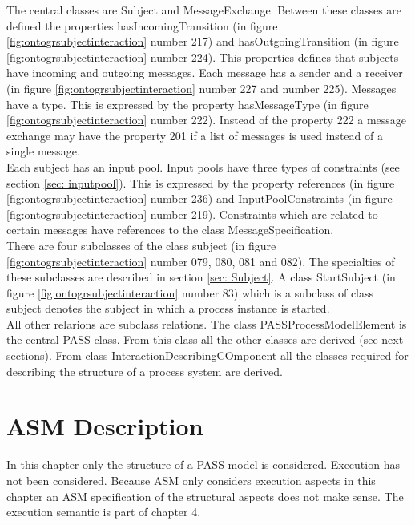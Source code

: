 The central classes are Subject and MessageExchange. Between these classes are defined the properties hasIncomingTransition (in figure \ref{fig:ontogrsubjectinteraction} number 217) and hasOutgoingTransition (in figure \ref{fig:ontogrsubjectinteraction} number 224). This properties defines that subjects have incoming and outgoing messages. Each message has a sender and a receiver (in figure \ref{fig:ontogrsubjectinteraction} number 227 and number 225). Messages have a type. This is expressed by the property hasMessageType (in figure \ref{fig:ontogrsubjectinteraction} number 222). Instead of the property 222 a message exchange may have the property 201 if a list of messages is used instead of a single message.\\
Each subject has an input pool. Input pools have three types of constraints (see section \ref{sec: inputpool}). This is expressed by the property references  (in figure \ref{fig:ontogrsubjectinteraction} number 236) and InputPoolConstraints (in figure \ref{fig:ontogrsubjectinteraction} number 219). Constraints which are related to certain messages have references to the class MessageSpecification.\\
There are four subclasses of the class subject (in figure \ref{fig:ontogrsubjectinteraction} number 079, 080, 081 and 082). The specialties of these subclasses are described in section \ref{sec: Subject}. A class StartSubject (in figure \ref{fig:ontogrsubjectinteraction} number 83) which is a subclass of class subject denotes the subject in which a process instance is started.\\
All other relarions are subclass relations. The class PASSProcessModelElement is the central PASS class. From this class all the other classes are derived (see next sections). From class InteractionDescribingCOmponent all the classes required for describing the structure of a process system are derived.

\section{ASM Description}
In this chapter only the structure of a PASS model is considered. Execution has not been considered. Because ASM only considers execution aspects in this chapter an ASM specification of the structural aspects does not make sense. The execution semantic is part of chapter 4.